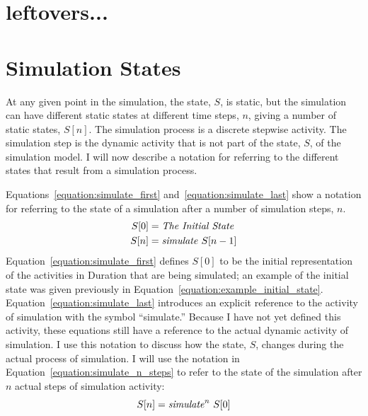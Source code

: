 \section{leftovers...}

\section{Simulation States}

At any given point in the simulation, the state, $S$, is static, but
the simulation can have different static states at different time
steps, $n$, giving a number of static states, $S[n]$.  The simulation
process is a discrete stepwise activity.  The simulation step is the
dynamic activity that is not part of the state, $S$, of the simulation
model.  I will now describe a notation for referring to the different
states that result from a simulation process.

Equations~\ref{equation:simulate_first}
and~\ref{equation:simulate_last} show a notation for referring to the
state of a simulation after a number of simulation steps, $n$.
\begin{align}
\label{equation:simulate_first}
S[0] &= \text{\emph{The Initial State}} \\
\label{equation:simulate_last}
S[n] &= \text{\emph{simulate}}~S[n-1]
\end{align}
Equation~\ref{equation:simulate_first} defines $S[0]$ to be
the initial representation of the activities in Duration that are
being simulated; an example of the initial state was given previously
in Equation~\ref{equation:example_initial_state}.
Equation~\ref{equation:simulate_last} introduces an explicit reference
to the activity of simulation with the symbol ``simulate.''  Because I
have not yet defined this activity, these equations still have a
reference to the actual dynamic activity of simulation.  I use this
notation to discuss how the state, $S$, changes during the
actual process of simulation.  I will use the notation in
Equation~\ref{equation:simulate_n_steps} to refer to the state of the
simulation after $n$ actual steps of simulation activity:
\begin{equation}
\label{equation:simulate_n_steps}
S[n] = \text{\emph{simulate}}^n~S[0]
\end{equation}
